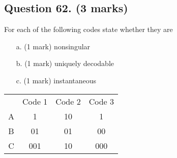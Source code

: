 \subsection*{Question 62. (3 marks) } For each of the following codes state whether they are
\begin{itemize}
	\item[a.] (1 mark) nonsingular
	\item[b.] (1 mark) uniquely decodable
	\item[c.] (1 mark) instantaneous
\end{itemize}
\begin{center}
	\begin{tabular}{|c|c|c|c|}
		\hline
		& Code 1 & Code 2 & Code 3 \\
		A & 1 & 10 & 1 \\
		B & 01 & 01 & 00 \\
		C & 001 & 10 & 000 \\
		\hline
	\end{tabular}
\end{center}

